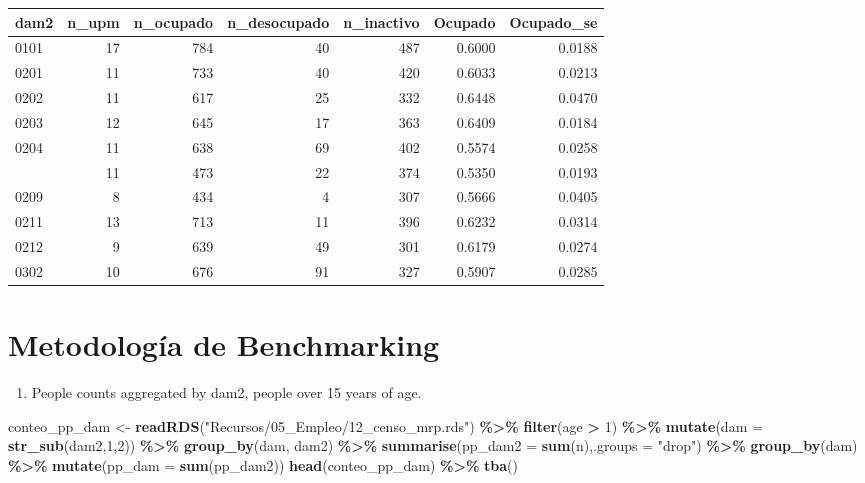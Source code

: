 \documentclass[
  12pt,
]{book}
\newenvironment{Shaded}{\begin{snugshade}}{\end{snugshade}}
\newcommand{\AttributeTok}[1]{\textcolor[rgb]{0.13,0.29,0.53}{#1}}
\newcommand{\DecValTok}[1]{\textcolor[rgb]{0.00,0.00,0.81}{#1}}
\newcommand{\FunctionTok}[1]{\textcolor[rgb]{0.13,0.29,0.53}{\textbf{#1}}}
\newcommand{\NormalTok}[1]{#1}
\newcommand{\OtherTok}[1]{\textcolor[rgb]{0.56,0.35,0.01}{#1}}
\newcommand{\SpecialCharTok}[1]{\textcolor[rgb]{0.81,0.36,0.00}{\textbf{#1}}}
\newcommand{\StringTok}[1]{\textcolor[rgb]{0.31,0.60,0.02}{#1}}
\providecommand{\tightlist}{%
  \setlength{\itemsep}{0pt}\setlength{\parskip}{0pt}}
\begin{document}
\begin{table}[H]
\centering
\centering
\begin{tabular}[t]{lrrrrrr}
\toprule
dam2 & n\_upm & n\_ocupado & n\_desocupado & n\_inactivo & Ocupado & Ocupado\_se\\
\midrule
0101 & 17 & 784 & 40 & 487 & 0.6000 & 0.0188\\
0201 & 11 & 733 & 40 & 420 & 0.6033 & 0.0213\\
0202 & 11 & 617 & 25 & 332 & 0.6448 & 0.0470\\
0203 & 12 & 645 & 17 & 363 & 0.6409 & 0.0184\\
0204 & 11 & 638 & 69 & 402 & 0.5574 & 0.0258\\
\addlinespace
0207 & 11 & 473 & 22 & 374 & 0.5350 & 0.0193\\
0209 & 8 & 434 & 4 & 307 & 0.5666 & 0.0405\\
0211 & 13 & 713 & 11 & 396 & 0.6232 & 0.0314\\
0212 & 9 & 639 & 49 & 301 & 0.6179 & 0.0274\\
0302 & 10 & 676 & 91 & 327 & 0.5907 & 0.0285\\
\bottomrule
\end{tabular}
\end{table}

\hypertarget{metodologuxeda-de-benchmarking}{%
\section{Metodología de Benchmarking}\label{metodologuxeda-de-benchmarking}}

\begin{enumerate}
\def\labelenumi{\arabic{enumi}.}
\tightlist
\item
  People counts aggregated by dam2, people over 15 years of age.
\end{enumerate}

\begin{Shaded}
\begin{Highlighting}[]
\NormalTok{conteo\_pp\_dam }\OtherTok{\textless{}{-}} \FunctionTok{readRDS}\NormalTok{(}\StringTok{"Recursos/05\_Empleo/12\_censo\_mrp.rds"}\NormalTok{) }\SpecialCharTok{\%\textgreater{}\%} 
   \FunctionTok{filter}\NormalTok{(age }\SpecialCharTok{\textgreater{}} \DecValTok{1}\NormalTok{)  }\SpecialCharTok{\%\textgreater{}\%} 
   \FunctionTok{mutate}\NormalTok{(}\AttributeTok{dam =} \FunctionTok{str\_sub}\NormalTok{(dam2,}\DecValTok{1}\NormalTok{,}\DecValTok{2}\NormalTok{)) }\SpecialCharTok{\%\textgreater{}\%} 
  \FunctionTok{group\_by}\NormalTok{(dam, dam2) }\SpecialCharTok{\%\textgreater{}\%} 
  \FunctionTok{summarise}\NormalTok{(}\AttributeTok{pp\_dam2 =} \FunctionTok{sum}\NormalTok{(n),}\AttributeTok{.groups =} \StringTok{"drop"}\NormalTok{) }\SpecialCharTok{\%\textgreater{}\%} 
  \FunctionTok{group\_by}\NormalTok{(dam) }\SpecialCharTok{\%\textgreater{}\%} 
  \FunctionTok{mutate}\NormalTok{(}\AttributeTok{pp\_dam =} \FunctionTok{sum}\NormalTok{(pp\_dam2))}
\FunctionTok{head}\NormalTok{(conteo\_pp\_dam) }\SpecialCharTok{\%\textgreater{}\%} \FunctionTok{tba}\NormalTok{()}
\end{Highlighting}
\end{Shaded}
\end{document}
